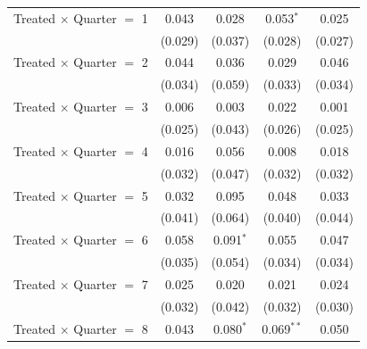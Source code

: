 \begin{longtable}{lcccc}
  Treated $\times$ Quarter $=$ 1  & 0.043                                              & 0.028          & 0.053$^{*}$    & 0.025          \\
                                  & (0.029)                                            & (0.037)        & (0.028)        & (0.027)        \\
  Treated $\times$ Quarter $=$ 2  & 0.044                                              & 0.036          & 0.029          & 0.046          \\
                                  & (0.034)                                            & (0.059)        & (0.033)        & (0.034)        \\
  Treated $\times$ Quarter $=$ 3  & 0.006                                              & 0.003          & 0.022          & 0.001          \\
                                  & (0.025)                                            & (0.043)        & (0.026)        & (0.025)        \\
  Treated $\times$ Quarter $=$ 4  & 0.016                                              & 0.056          & 0.008          & 0.018          \\
                                  & (0.032)                                            & (0.047)        & (0.032)        & (0.032)        \\
  Treated $\times$ Quarter $=$ 5  & 0.032                                              & 0.095          & 0.048          & 0.033          \\
                                  & (0.041)                                            & (0.064)        & (0.040)        & (0.044)        \\
  Treated $\times$ Quarter $=$ 6  & 0.058                                              & 0.091$^{*}$    & 0.055          & 0.047          \\
                                  & (0.035)                                            & (0.054)        & (0.034)        & (0.034)        \\
  Treated $\times$ Quarter $=$ 7  & 0.025                                              & 0.020          & 0.021          & 0.024          \\
                                  & (0.032)                                            & (0.042)        & (0.032)        & (0.030)        \\
  Treated $\times$ Quarter $=$ 8  & 0.043                                              & 0.080$^{*}$    & 0.069$^{**}$   & 0.050          \\

\end{longtable}
